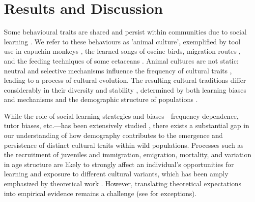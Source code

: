 \documentclass[9pt, onecolumn, twoside, lineno]{gsajnl}
\begin{document}
\section{Results and Discussion}

\lettrine[lines=2]Some behavioural traits are shared and persist within communities due to social learning \autocite{viciana2021}. We refer to these behaviours as 'animal culture', exemplified by tool use in capuchin monkeys \autocite{falotico2019}, the learned songs of oscine birds, migration routes \autocite{jesmer2018, berdahl2018, byholm2022}, and the feeding techniques of some cetaceans \autocite{allen2013, rendell2001}. Animal cultures are not static: neutral and selective mechanisms influence the frequency of cultural traits \autocite{potvin2015, williams2021}, leading to a process of cultural evolution. The resulting cultural traditions differ considerably in their diversity and stability \autocite{tchernichovski2017}, determined by both learning biases and mechanisms and the demographic structure of populations \autocite{deffner2022a, kandler2017}. 

While the role of social learning strategies and biases---frequency dependence, tutor biases, etc.---has been extensively studied \autocite{pike2010, kendal2015, aplin2017, lachlan2018, tchernichovski2021}, there exists a substantial gap in our understanding of how demography contributes to the emergence and persistence of distinct cultural traits within wild populations. Processes such as the recruitment of juveniles and immigration, emigration, mortality, and variation in age structure are likely to strongly affect an individual's opportunities for learning and exposure to different cultural variants, which has been amply emphasized by theoretical work \autocite{deffner2022a, deffner2022, kandler2023, fogarty2019, deffner2020, derex2016, kirby2021, nunn2009, barta2023, dyble2024, chimento2024}. However, translating theoretical expectations into empirical evidence remains a challenge (see \autocite{chimento2021, fayet2014, payne1993} for exceptions).
\end{document}
